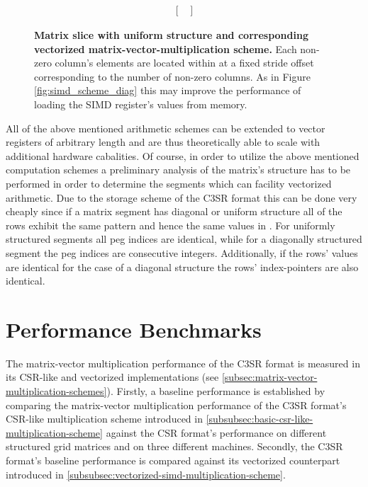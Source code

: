 \documentclass{article}
\begin{document}
\begin{figure}[ht]
$$\begin{matrix}
\begin{bmatrix}
                                                                                     \end{bmatrix}
        \end{matrix}
        $$
        \caption[Matrix slice with uniform structure and corresponding vectorized matrix-vector-multiplication scheme.]{\textbf{Matrix slice with uniform structure and corresponding vectorized matrix-vector-multiplication scheme.} Each non-zero column's elements are located within \V at a fixed stride offset corresponding to the number of non-zero columns. As in Figure \ref{fig:simd_scheme_diag} this may improve the performance of loading the SIMD register's values from memory.}
        \label{fig:simd_scheme_uniform}
      \end{figure}

      All of the above mentioned arithmetic schemes can be extended to vector registers of arbitrary length and are thus theoretically able to scale with additional hardware cabalities. Of course, in order to utilize the above mentioned computation schemes a preliminary analysis of the matrix's structure has to be performed in order to determine the segments which can facility vectorized arithmetic. Due to the storage scheme of the C3SR format this can be done very cheaply since if a matrix segment has diagonal or uniform structure all of the rows exhibit the same pattern and hence the same values in \JS. For uniformly structured segments all peg indices are identical, while for a diagonally structured segment the peg indices are consecutive integers. Additionally, if the rows' values are identical for the case of a diagonal structure the rows' index-pointers \VS are also identical.

\section{Performance Benchmarks}

  The matrix-vector multiplication performance of the C3SR format is measured in its CSR-like and vectorized implementations (see \ref{subsec:matrix-vector-multiplication-schemes}). Firstly, a baseline performance is established by comparing the matrix-vector multiplication performance of the C3SR format's CSR-like multiplication scheme introduced in \ref{subsubsec:basic-csr-like-multiplication-scheme} against the CSR format's performance on different structured grid matrices and on three different machines. Secondly, the C3SR format's baseline performance is compared against its vectorized counterpart introduced in \ref{subsubsec:vectorized-simd-multiplication-scheme}.
\end{document}
